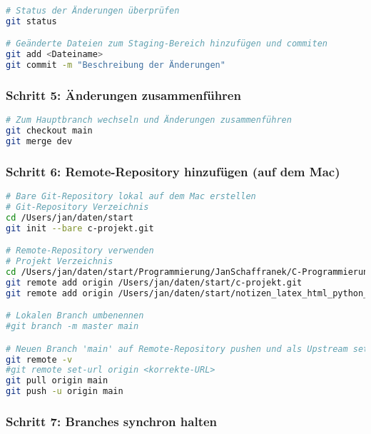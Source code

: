 \documentclass{vorlage-design-main}
\begin{document}
\begin{lstlisting}[language=bash]
# Status der Änderungen überprüfen
git status

# Geänderte Dateien zum Staging-Bereich hinzufügen und commiten
git add <Dateiname>
git commit -m "Beschreibung der Änderungen"
\end{lstlisting}

\hypertarget{schritt-5-uxe4nderungen-zusammenfuxfchren}{%
\subsubsection{Schritt 5: Änderungen
zusammenführen}\label{schritt-5-aenderungen-zusammenfuehren}}

\begin{lstlisting}[language=bash]
# Zum Hauptbranch wechseln und Änderungen zusammenführen
git checkout main
git merge dev
\end{lstlisting}

\hypertarget{schritt-6-remote-repository-hinzufuxfcgen-auf-dem-mac}{%
\subsubsection{Schritt 6: Remote-Repository hinzufügen (auf dem
Mac)}\label{schritt-6-remote-repository-hinzufuegen-auf-dem-mac}}

\begin{lstlisting}[language=bash]
# Bare Git-Repository lokal auf dem Mac erstellen
# Git-Repository Verzeichnis
cd /Users/jan/daten/start
git init --bare c-projekt.git

# Remote-Repository verwenden
# Projekt Verzeichnis
cd /Users/jan/daten/start/Programmierung/JanSchaffranek/C-Programmierung/c-projekte
git remote add origin /Users/jan/daten/start/c-projekt.git
git remote add origin /Users/jan/daten/start/notizen_latex_html_python_v1

# Lokalen Branch umbenennen
#git branch -m master main

# Neuen Branch 'main' auf Remote-Repository pushen und als Upstream setzen
git remote -v
#git remote set-url origin <korrekte-URL>
git pull origin main
git push -u origin main
\end{lstlisting}

\hypertarget{schritt-7-branches-synchron-halten}{%
\subsubsection{Schritt 7: Branches synchron
halten}\label{schritt-7-branches-synchron-halten}}
\end{document}
